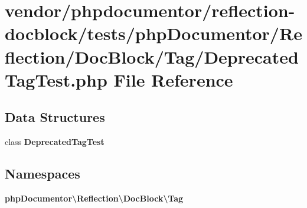 \section{vendor/phpdocumentor/reflection-\/docblock/tests/php\+Documentor/\+Reflection/\+Doc\+Block/\+Tag/\+Deprecated\+Tag\+Test.php File Reference}
\label{_deprecated_tag_test_8php}
\subsection*{Data Structures}
\begin{DoxyCompactItemize}
\item 
class {\bf Deprecated\+Tag\+Test}
\end{DoxyCompactItemize}
\subsection*{Namespaces}
\begin{DoxyCompactItemize}
\item 
 {\bf php\+Documentor\textbackslash{}\+Reflection\textbackslash{}\+Doc\+Block\textbackslash{}\+Tag}
\end{DoxyCompactItemize}
